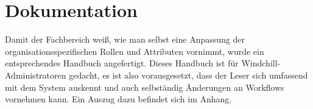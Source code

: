 \section{Dokumentation} %
\label{sec:Dokumentation}

Damit der Fachbereich weiß, wie man selbst eine Anpassung der organisationsspezifischen Rollen und Attributen vornimmt, wurde ein entsprechendes Handbuch angefertigt.
Dieses Handbuch ist für Windchill-Administratoren gedacht, es ist also vorausgesetzt, dass der Leser sich umfassend mit dem System auskennt und auch selbständig Änderungen an \zB Workflows vornehmen kann.
Ein Auszug dazu befindet sich im Anhang.
